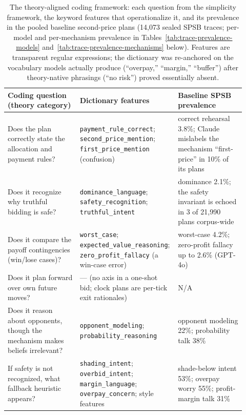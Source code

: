 \begin{table}[htbp]
\centering
\footnotesize
\setlength{\tabcolsep}{5pt}
\begin{tabular}{p{0.30\linewidth}p{0.34\linewidth}p{0.28\linewidth}}
\toprule
Coding question (theory category) & Dictionary features & Baseline SPSB prevalence \\
\midrule
Does the plan correctly state the allocation and payment rules? & \texttt{payment\_rule\_correct}; \texttt{second\_price\_mention}; \texttt{first\_price\_mention} (confusion) & correct rehearsal 3.8\%; Claude mislabels the mechanism ``first-price'' in 10\% of its plans \\
\addlinespace
Does it recognize why truthful bidding is safe? & \texttt{dominance\_language}; \texttt{safety\_recognition}; \texttt{truthful\_intent} & dominance 2.1\%; the safety invariant is echoed in 3 of 21{,}990 plans corpus-wide \\
\addlinespace
Does it compare the payoff contingencies (win/lose cases)? & \texttt{worst\_case}; \texttt{expected\_value\_reasoning}; \texttt{zero\_profit\_fallacy} (a win-case error) & worst-case 4.2\%; zero-profit fallacy up to 2.6\% (GPT-4o) \\
\addlinespace
Does it plan forward over own future moves? & --- (no axis in a one-shot bid; clock plans are per-tick exit rationales) & N/A \\
\addlinespace
Does it reason about opponents, though the mechanism makes beliefs irrelevant? & \texttt{opponent\_modeling}; \texttt{probability\_reasoning} & opponent modeling 22\%; probability talk 38\% \\
\addlinespace
If safety is not recognized, what fallback heuristic appears? & \texttt{shading\_intent}; \texttt{overbid\_intent}; \texttt{margin\_language}; \texttt{overpay\_concern}; style features & shade-below intent 53\%; overpay worry 55\%; profit-margin talk 31\% \\
\bottomrule
\end{tabular}
\caption{The theory-aligned coding framework: each question from the simplicity framework, the keyword features that operationalize it, and its prevalence in the pooled baseline second-price plans (14{,}073 sealed SPSB traces; per-model and per-mechanism prevalence in Tables~\ref{tab:trace-prevalence-models} and~\ref{tab:trace-prevalence-mechanisms} below). Features are transparent regular expressions; the dictionary was re-anchored on the vocabulary models actually produce (``overpay,'' ``margin,'' ``buffer'') after theory-native phrasings (``no risk'') proved essentially absent.}
\label{tab:trace-coding}
\end{table}


